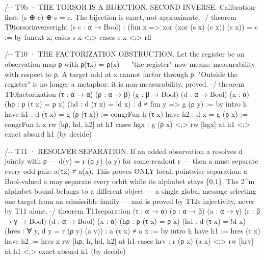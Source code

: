 \documentclass[10pt]{article}
\renewcommand{\_}{\origunderscore\allowbreak}
\newenvironment{Shaded}{}{}
\newcommand{\NormalTok}[1]{#1}
\begin{document}
\begin{Shaded}
\begin{Highlighting}[]
\NormalTok{/{-}{-} T9b · THE TORSOR IS A BIJECTION, SECOND INVERSE. Calibration{-}first:}
\NormalTok{    (s ⊕ c) ⊕ s = c. The bijection is exact, not approximate. {-}/}
\NormalTok{theorem T9\_torsor\_inverse\_right (s c : α → Bool) :}
\NormalTok{    (fun x =\textgreater{} xor (xor (s x) (c x)) (s x)) = c := by}
\NormalTok{  funext x; cases s x \textless{};\textgreater{} cases c x \textless{};\textgreater{} rfl}

\NormalTok{/{-}{-} T10 · THE FACTORIZATION OBSTRUCTION. Let the register be an observation}
\NormalTok{    map ρ with ρ(τx) = ρ(x) — "the register" now means: measurability with}
\NormalTok{    respect to ρ. A target odd at x cannot factor through ρ. "Outside the}
\NormalTok{    register" is no longer a metaphor: it is non{-}measurability, proved. {-}/}
\NormalTok{theorem T10\_factorization (τ : α → α) (ρ : α → β) (g : β → Bool)}
\NormalTok{    (d : α → Bool) (x : α)}
\NormalTok{    (hρ : ρ (τ x) = ρ x) (hd : d (τ x) = !d x) :}
\NormalTok{    d ≠ fun y =\textgreater{} g (ρ y) := by}
\NormalTok{  intro h}
\NormalTok{  have h1 : d (τ x) = g (ρ (τ x)) := congrFun h (τ x)}
\NormalTok{  have h2 : d x = g (ρ x) := congrFun h x}
\NormalTok{  rw [hρ, hd, h2] at h1}
\NormalTok{  cases hgx : g (ρ x) \textless{};\textgreater{} rw [hgx] at h1 \textless{};\textgreater{} exact absurd h1 (by decide)}

\NormalTok{/{-}{-} T11 · RESOLVER SEPARATION. If an added observation a resolves d jointly}
\NormalTok{    with ρ — d(y) = r (ρ y) (a y) for some readout r — then a must separate}
\NormalTok{    every odd pair: a(τx) ≠ a(x). This proves ONLY local, pointwise}
\NormalTok{    separation: a Bool{-}valued a may separate every orbit while its alphabet}
\NormalTok{    stays \{0,1\}. The 2\^{}m alphabet bound belongs to a different object — a}
\NormalTok{    single global message selecting one target from an admissible family —}
\NormalTok{    and is proved by T12\textquotesingle{}s injectivity, never by T11 alone. {-}/}
\NormalTok{theorem T11\_separation (τ : α → α) (ρ : α → β) (a : α → γ) (r : β → γ → Bool)}
\NormalTok{    (d : α → Bool) (x : α)}
\NormalTok{    (hρ : ρ (τ x) = ρ x) (hd : d (τ x) = !d x)}
\NormalTok{    (hres : ∀ y, d y = r (ρ y) (a y)) :}
\NormalTok{    a (τ x) ≠ a x := by}
\NormalTok{  intro h}
\NormalTok{  have h1 := hres (τ x)}
\NormalTok{  have h2 := hres x}
\NormalTok{  rw [hρ, h, hd, h2] at h1}
\NormalTok{  cases hrv : r (ρ x) (a x) \textless{};\textgreater{} rw [hrv] at h1 \textless{};\textgreater{} exact absurd h1 (by decide)}


\end{Highlighting}
\end{Shaded}
\end{document}
